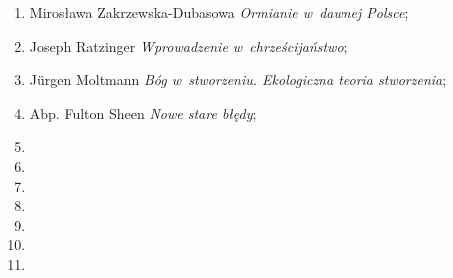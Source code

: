 \documentclass[a4paper,11pt]{article}
\begin{document}
\begin{enumerate}
\item Mirosława Zakrzewska-Dubasowa \textit{Ormianie w~dawnej Polsce};



\item Joseph Ratzinger \textit{Wprowadzenie w~chrześcijaństwo};



\item J\"{u}rgen Moltmann \textit{Bóg w~stworzeniu. Ekologiczna teoria
    stworzenia};



\item Abp. Fulton Sheen \textit{Nowe stare błędy};



\item



\item



\item



\item



\item



\item



\item




\end{enumerate}
\end{document}

